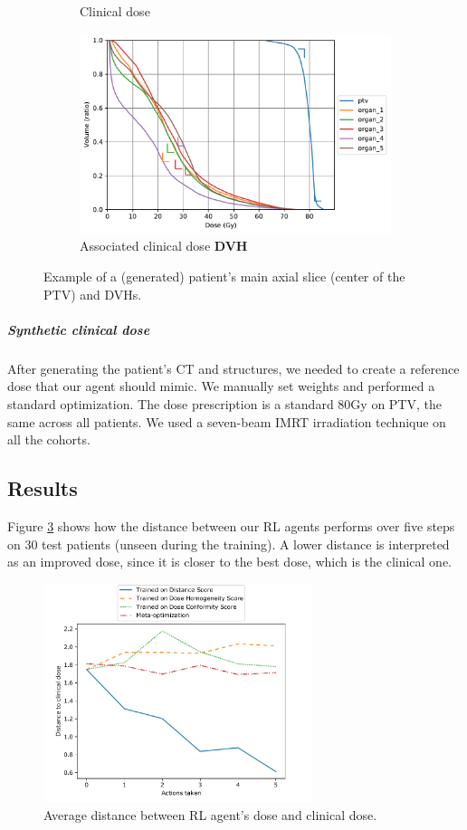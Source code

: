 \begin{figure}
\begin{subfigure}{0.48\linewidth}
		\caption{Clinical dose}
	\end{subfigure}
	\begin{subfigure}{\linewidth}
		\centering
		\includegraphics[width=0.8\linewidth]{AIME/dvh_example.pdf}
		\caption{Associated clinical dose \textbf{DVH}}
		\label{fig:clinical_dvh}
	\end{subfigure}
	\caption{Example of a (generated) patient's main axial slice (center of the PTV) and DVHs.}
\end{figure}

\subparagraph{Synthetic clinical dose}
After generating the patient's CT and structures, we needed to create a reference dose that our agent should mimic.
We manually set weights and performed a standard optimization.
The dose prescription is a standard 80Gy on PTV, the same across all patients.
We used a seven-beam IMRT irradiation technique on all the cohorts.

\subsection{Results}
Figure \ref{fig:distance} shows how the distance between our RL agents performs over five steps on 30 test patients (unseen during the training).
A lower distance is interpreted as an improved dose, since it is closer to the best dose, which is the clinical one.
\begin{figure}
	\centering
	\includegraphics[width=0.7\textwidth]{AIME/DistanceToClinicalDose.pdf}
	\caption{Average distance between RL agent's dose and clinical dose.}
	\label{fig:distance}
\end{figure}

